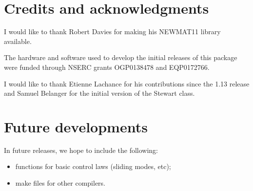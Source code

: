 \documentclass[11pt,fleqn,letterpaper]{report}
\begin{document}
\chapter{Credits and acknowledgments}

I would like to thank Robert Davies for making his \textsf{NEWMAT11}
library available.

The hardware and software used to develop the initial releases of this
package were funded through NSERC grants OGP0138478 and EQP0172766.

I would like to thank Etienne Lachance for his contributions since the
1.13 release and Samuel Belanger for the initial version of the
Stewart class.

\chapter{Future developments}

In future releases, we hope to include the following:
\begin{itemize}
\item functions for basic control laws (sliding modes, etc);
\item make files for other compilers.
\end{itemize}





\appendix




\end{document}
